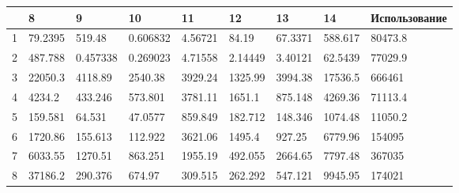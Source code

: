 \documentclass[12pt, a4paper]{article}
\begin{document}
\begin{tabular}{|l|llllllll|}
\hline
{} &  8 & 9 & 10 & 11 & 12 & 13 & 14 & Использование \\
\hline
1 &    79.2395 &                                             519.48 &                                  0.606832 &                                           4.56721 &        84.19 &                                            67.3371 &                  588.617 &       80473.8 \\
2   &                    487.788 &                                           0.457338 &                                  0.269023 &                                           4.71558 &      2.14449 &                                            3.40121 &                  62.5439 &       77029.9 \\
3 &                    22050.3 &                                            4118.89 &                                   2540.38 &                                           3929.24 &      1325.99 &                                            3994.38 &                  17536.5 &        666461 \\
4  &                     4234.2 &                                            433.246 &                                   573.801 &                                           3781.11 &       1651.1 &                                            875.148 &                  4269.36 &       71113.4 \\
5  &                    159.581 &                                             64.531 &                                   47.0577 &                                           859.849 &      182.712 &                                            148.346 &                  1074.48 &       11050.2 \\
6  &                    1720.86 &                                            155.613 &                                   112.922 &                                           3621.06 &       1495.4 &                                             927.25 &                  6779.96 &        154095 \\
7&                    6033.55 &                                            1270.51 &                                   863.251 &                                           1955.19 &      492.055 &                                            2664.65 &                  7797.48 &        367035 \\
8 &                    37186.2 &                                            290.376 &                                    674.97 &                                           309.515 &      262.292 &                                            547.121 &                  9945.95 &        174021 \\

\end{tabular}
\end{document}
